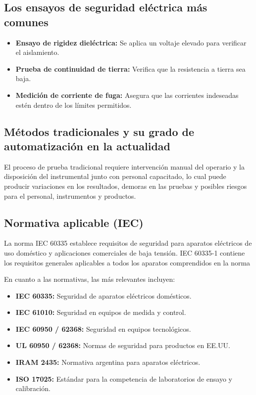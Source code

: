 \documentclass[a4paper,12pt]{article}
\begin{document}
\subsection{Los ensayos de seguridad eléctrica más comunes}
\begin{itemize}
    \item \textbf{Ensayo de rigidez dieléctrica:} Se aplica un voltaje elevado para verificar el aislamiento.
    \item \textbf{Prueba de continuidad de tierra:} Verifica que la resistencia a tierra sea baja.
    \item \textbf{Medición de corriente de fuga:} Asegura que las corrientes indeseadas estén dentro de los límites permitidos.
\end{itemize}

\subsection{Métodos tradicionales y su grado de automatización en la
actualidad}
El proceso de prueba tradicional requiere intervención manual del operario y la disposición
del instrumental junto con personal capacitado, lo cual puede producir variaciones en los
resultados, demoras en las pruebas y posibles riesgos para el personal, instrumentos y
productos.
\subsection{Normativa aplicable (IEC)}
La norma IEC 60335 establece requisitos de seguridad para aparatos eléctricos de uso
doméstico y aplicaciones comerciales de baja tensión.
IEC 60335-1 contiene los requisitos generales aplicables a todos los aparatos comprendidos
en la norma

En cuanto a las normativas, las más relevantes incluyen:
\begin{itemize}
    \item \textbf{IEC 60335:} Seguridad de aparatos eléctricos domésticos.

    \item \textbf{IEC 61010:} Seguridad en equipos de medida y control.

    \item \textbf{IEC 60950 / 62368:} Seguridad en equipos tecnológicos.

    \item \textbf{UL 60950 / 62368:} Normas de seguridad para productos en EE.UU.

    \item \textbf{IRAM 2435:} Normativa argentina para aparatos eléctricos.

    \item \textbf{ISO 17025:} Estándar para la competencia de laboratorios de ensayo y calibración.

\end{itemize}
\end{document}
